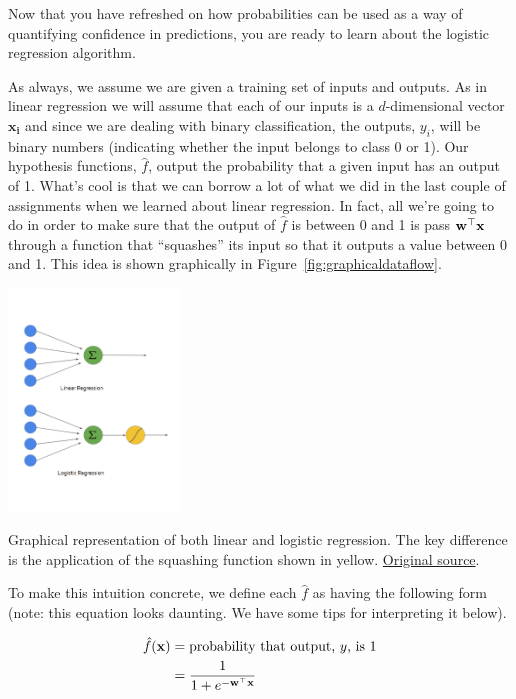 \documentclass[assignment04_Solutions]{subfiles}
\begin{document}
Now that you have refreshed on how probabilities can be used as a way of quantifying confidence in predictions, you are ready to learn about the logistic regression algorithm.

As always, we assume we are given a training set of inputs and outputs.  As in linear regression we will assume that each of our inputs is a $d$-dimensional vector $\mathbf{x_i}$ and since we are dealing with binary classification, the outputs, $y_i$, will be binary numbers (indicating whether the input belongs to class 0 or 1).  Our hypothesis functions, $\hat{f}$, output the probability that a given input has an output of 1.  What's cool is that we can borrow a lot of what we did in the last couple of assignments when we learned about linear regression.  In fact, all we're going to do in order to make sure that the output of $\hat{f}$ is between 0 and 1 is pass $\mathbf{w}^\top \mathbf{x}$ through a function that ``squashes'' its input so that it outputs a value between 0 and 1.  This idea is shown graphically in Figure~\ref{fig:graphicaldataflow}.

\begin{marginfigure}

\includegraphics[width=1.8in]{figures/linearandlogistic}

\caption{Graphical representation of both linear and logistic regression.  The key difference is the application of the squashing function shown in yellow.  \href{https://towardsdatascience.com/building-a-logistic-regression-in-python-301d27367c24}{Original source}.}\label{fig:graphicaldataflow}

\end{marginfigure}
To make this intuition concrete, we define each $\hat{f}$ as having the following form (note: this equation looks daunting. We have some tips for interpreting it below).

\begin{align}
\hat{f}(\mathbf{x}) &= \mbox{probability that output, $y$, is 1} \nonumber \\
&=\frac{1}{1 + e^{-\mathbf{w}^\top \mathbf{x}}} \label{eq:logistichypothesis}
\end{align}
\end{document}
